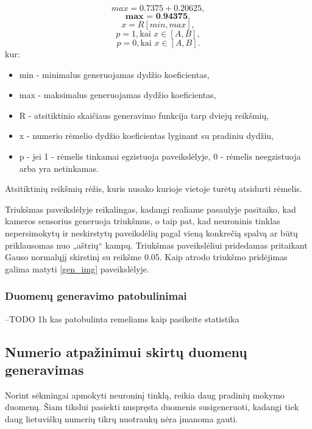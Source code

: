 \documentclass{VUMIFInfBakalaurinis}
\begin{document}
\begin{equation*}
  max = 0.7375 + 0.20625,
\end{equation*}
\begin{equation*}
  \textbf{max = 0.94375},
\end{equation*}
\begin{equation*}
  x = R[min, max],
\end{equation*}
\begin{equation*}
  p = 1, \text{kai } x \in [A, B],
\end{equation*}
\begin{equation*}
  p = 0, \text{kai } x \in [A, B].
\end{equation*}
kur:
\begin{itemize}[itemsep=0.5pt]
  \item min - minimalus generuojamas dydžio koeficientas,
  \item max - maksimalus generuojamas dydžio koeficientas,
  \item R - atsitiktinio skaičiaus generavimo funkcija tarp dviejų reikšmių,
  \item x - numerio rėmelio dydžio koeficientas lyginant su pradiniu dydžiu,
  \item p - jei 1 - rėmelis tinkamai egzistuoja paveikslėlyje, 0 - rėmelis neegzistuoja arba yra netinkamas.
\end{itemize}

Atsitiktinių reikšmių rėžis, kuris nusako kurioje vietoje turėtų atsidurti rėmelis.

Triukšmas paveikslėlyje reikalingas, kadangi realiame pasaulyje pasitaiko, kad kameros sensorius generuoja triukšmus, o taip pat,
kad neuroninis tinklas nepersimokytų ir neskirstytų paveikslėlių pagal vieną konkrečią spalvą ar būtų priklausomas nuo „aštrių“ kampų.
Triukšmas paveikslėliui pridedamas pritaikant Gauso normalųjį skirstinį su reikšme 0.05.
Kaip atrodo triukšmo pridėjimas galima matyti \ref{gen_img} paveikslėlyje.

\subsubsection{Duomenų generavimo patobulinimai}
--TODO
1h
kas patobulinta remeliams
kaip pasikeite statistika


\subsection{Numerio atpažinimui skirtų duomenų generavimas}
Norint sėkmingai apmokyti neuroninį tinklą, reikia daug pradinių mokymo duomenų. Šiam tikslui pasiekti nuspręsta duomenis susigeneruoti, kadangi tiek daug lietuviškų numerių
tikrų nuotraukų nėra įmanoma gauti. 
\end{document}
